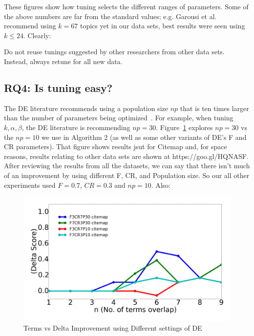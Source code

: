 \documentclass[10pt,conference]{IEEEtran}
\theoremstyle{break}
\begin{document}
  These figures
show how tuning selects the different ranges  of
parameters. 
Some of the above numbers are far from the standard values; e.g. Garousi et al.~\cite{garousi2016citations} recommend using $k=67$ topics
yet in our data sets, best results were seen using $k \le 24$.
Clearly:

\begin{lesson}
  Do not  reuse tunings suggested by other researchers from other data sets.
  Instead, always retune for all new data.
\end{lesson}

\subsection{\textbf{RQ4: Is  tuning  easy?}}


The DE literature
recommends using a population size $np$ that is ten times larger than the number of parameters being
optimized~\cite{storn1997differential}.  For example, when tuning $k,\alpha,\beta$,
the DE literature is recommending $np=30$.
Figure~\ref{fig:RQ4} explores $np=30$ vs the $np=10$ we use in Algorithm 2
(as well as some other variants of DE's F and CR parameters).
That figure shows results jsut for Citemap and, for space reasons, results
relating to other data sets are shown at https://goo.gl/HQNASF.
After reviewing the results from all the datasets, we can say that there isn't much of an improvement by using different F, CR, and Population size. So our all other experiments used $F=0.7$, $CR=0.3$ and $np = 10$.
Also:

\begin{figure}[!h]
  \includegraphics[width=\linewidth]{./fig/citemap.png}
  \caption{Terms vs Delta Improvement using Different settings of DE}
  \label{fig:RQ4}
\end{figure}
\end{document}
